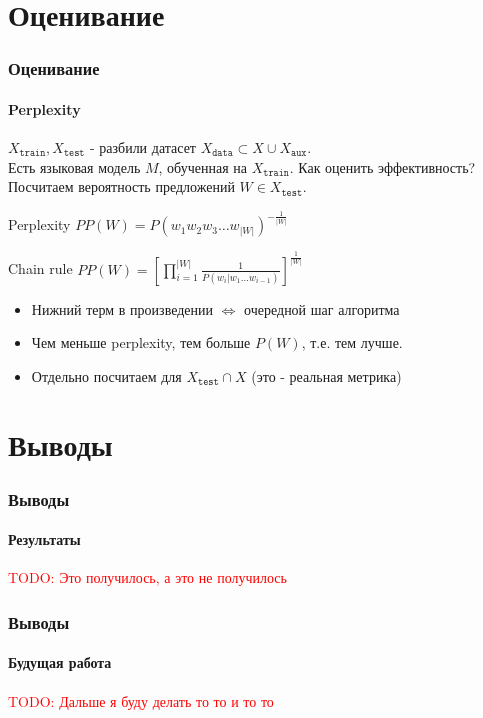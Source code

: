 \documentclass[10pt]{beamer}
\newcommand\TODO[1]{\textcolor{red}{{\Large TODO: #1}}}
\begin{document}
\section{Оценивание}
\begin{frame}
\frametitle{Оценивание}
\framesubtitle{Perplexity}

$X_{\texttt{train}}, X_{\texttt{test}}$ - разбили датасет $X_{\texttt{data}} \subset X \cup X_{\texttt{aux}}$. \\
Есть языковая модель $M$, обученная на $X_{\texttt{train}}$. Как оценить эффективность? Посчитаем вероятность предложений $W \in X_{\texttt{test}}$.

\begin{block}{Perplexity}
    $PP(W) = P(w_1w_2w_3\dots w_{|W|})^{-\frac{1}{|W|}}$
\end{block}

\begin{block}{Chain rule}
    $PP(W) = \left[\prod\limits_{i=1}^{|W|}{\frac{1}{P(w_i|w_1\dots w_{i-1})}}\right]^{\frac{1}{|W|}}$
\end{block}

\begin{itemize}
    \item Нижний терм в произведении $\Leftrightarrow$ очередной шаг алгоритма
    \item Чем меньше perplexity, тем больше $P(W)$, т.е. тем лучше.
    \item Отдельно посчитаем для $X_{\texttt{test}} \cap X$ (это - реальная метрика)
\end{itemize}

\end{frame}
\section{Выводы}
\begin{frame}
\frametitle{Выводы}
\framesubtitle{Результаты}

\TODO{Это получилось, а это не получилось}

\end{frame}
\begin{frame}
\frametitle{Выводы}
\framesubtitle{Будущая работа}

\TODO{Дальше я буду делать то то и то то}

\end{frame}
\end{document}
